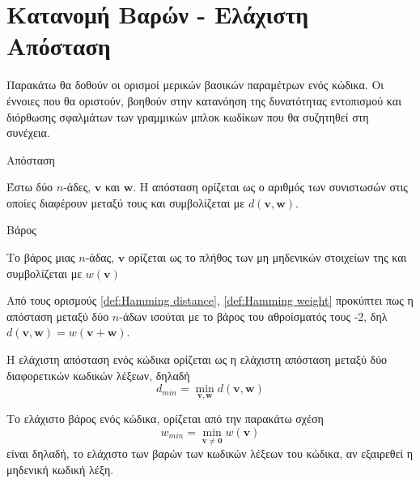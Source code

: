 \section{Κατανομή Βαρών - Ελάχιστη Απόσταση }

Παρακάτω θα δοθούν οι ορισμοί μερικών βασικών παραμέτρων ενός κώδικα. Οι έννοιες που θα οριστούν, βοηθούν στην κατανόηση της δυνατότητας εντοπισμού και διόρθωσης σφαλμάτων των γραμμικών μπλοκ κωδίκων που θα συζητηθεί στη συνέχεια.

\begin{definition}Απόσταση 

Έστω δύο $n$-άδες, $\mathbf{v}$ και $\mathbf{w}$. Η απόσταση  ορίζεται ως ο αριθμός των συνιστωσών στις οποίες διαφέρουν μεταξύ τους και συμβολίζεται με $d\left(\mathbf{v},\mathbf{w}\right)$.
\label{def:Hamming distance}
\end{definition}

\begin{definition}Βάρος 

Το βάρος  μιας $n$-άδας, $\mathbf{v}$ ορίζεται ως το πλήθος των μη μηδενικών στοιχείων της και συμβολίζεται με $w\left(\mathbf{v}\right)$
\label{def:Hamming weight}
\end{definition}

Από τους ορισμούς \ref{def:Hamming distance}, \ref{def:Hamming weight} προκύπτει πως η απόσταση  μεταξύ δύο $n$-άδων ισούται με το βάρος του αθροίσματός τους -2, δηλ $d\left(\mathbf{v},\mathbf{w}\right) = w\left(\mathbf{v}+\mathbf{w}\right)$.

\begin{definition}
Η ελάχιστη απόσταση ενός κώδικα ορίζεται ως η ελάχιστη απόσταση  μεταξύ δύο διαφορετικών κωδικών λέξεων, δηλαδή
\begin{equation}
d_{min} = \min_{\mathbf{v}, \mathbf{w}}d\left(\mathbf{v}, \mathbf{w}\right)
\label{eq:min distance}
\end{equation}
\end{definition}

\begin{definition}
Το ελάχιστο βάρος ενός κώδικα, ορίζεται από την παρακάτω σχέση
\begin{equation}
w_{min} = \min_{\mathbf{v}\neq\mathbf{0}}w\left(\mathbf{v}\right)
\label{eq:min weight}
\end{equation}
είναι δηλαδή, το ελάχιστο των βαρών των κωδικών λέξεων του κώδικα, αν εξαιρεθεί η μηδενική κωδική λέξη.
\end{definition}


